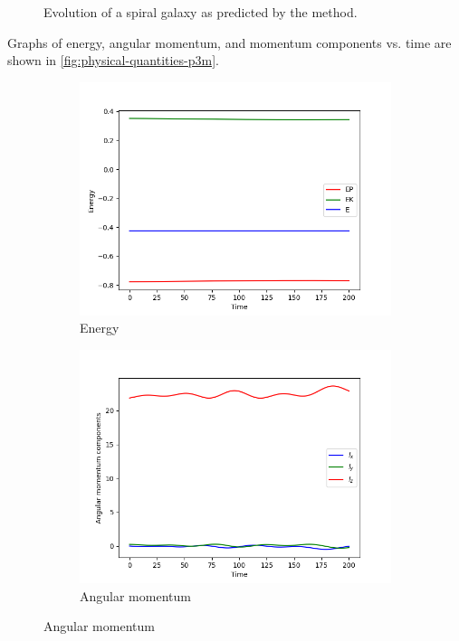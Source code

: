 \begin{figure}[htp]
    \caption{Evolution of a spiral galaxy as predicted by the \PThreeM{} method.}
    \label{fig:spiral-galaxy-evolution-p3m}
\end{figure}
Graphs of energy, angular momentum, and momentum components vs. time are shown in \autoref{fig:physical-quantities-p3m}.
\begin{figure}[htp]
    \centering
    \begin{subfigure}[b]{0.45\textwidth}
        \centering
        \includegraphics[width=\textwidth]{img/p3m/energy.png}
        \caption{Energy}
        \label{fig:physical-quantities-p3m-sub1}
    \end{subfigure}
    \hfill
    \begin{subfigure}[b]{0.45\textwidth}
        \centering
        \includegraphics[width=\textwidth]{img/p3m/angular-momentum.png}
        \caption{Angular momentum}
        \label{fig:physical-quantities-p3m-sub2}
    \end{subfigure}


\end{figure}
